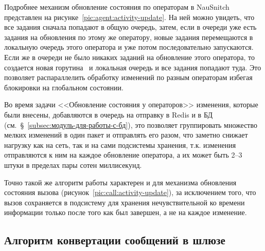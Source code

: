 Подробнее механизм обновление состояния по операторам в NauSnitch представлен на рисунке~\ref{pic:agent:activity-update}.
На ней можно увидеть, что все задания сначала попадают в общую очередь,
затем, если в очереди уже есть задания на обновления по этому же оператору,
новые задания перемещаются в локальную очередь этого оператора и уже потом последовательно запускаются.
Если же в очереди не было никаких заданий на обновление этого оператора,
то создается новая горутина~\cite{Whygoroutinesarenotlightweightthreads,Goroutines,goroutineallabout} и локальная очередь и все задания попадают туда.
Это позволяет распараллелить обработку изменений по разным операторам
избегая блокировки на глобальном состоянии.

Во время задачи <<Обновление состояния у операторов>>
изменения, которые были внесены, добавляются в очередь на отправку в Redis и в БД (см.~\S~\ref{subsec:модуль-для-работы-с-бд}),
это позволяет группировать множество мелких изменений в один пакет и отправлять его разом,
что заметно снижает нагрузку как на сеть, так и на сами подсистемы хранения,
т.к. изменения отправляются к ним на каждое обновление оператора, а их может быть 2--3 штуки в пределах пары сотен миллисекунд.

Точно такой же алгоритм работы характерен и для механизма обновления состояния вызова (рисунок~\ref{pic:call:activity-update}),
за исключением того,
что вызов сохраняется в подсистему для хранения нечувствительной ко времени информации только после того как был завершен,
а не на каждое изменение.



\subsection{Алгоритм конвертации сообщений в шлюзе}\label{subsec:алгоритм-конвертации-сообщений-в-шлюзе}

